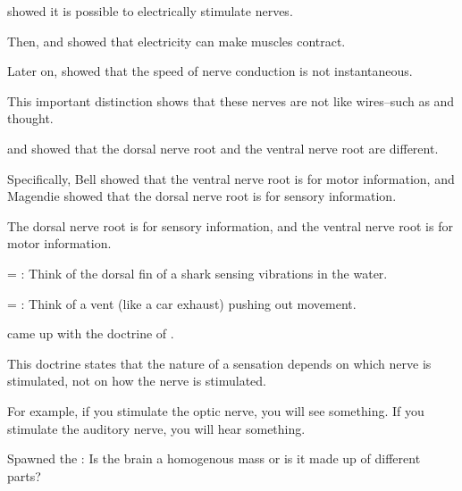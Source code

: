 \begin{coloredlist}
    \item \label{person:newton} showed it is possible to electrically stimulate nerves.
    \item Then, \label{{person:galvani}}  and \label{person:bois-reymond} showed that electricity can make muscles contract.
    \item Later on,  showed that the speed of nerve conduction is not instantaneous.
    \item This important distinction shows that these nerves are not like wires--such as  and  thought.
    \item {} and  showed that the dorsal nerve root and the ventral nerve root are different.
    \begin{coloredlist}
        \item Specifically, Bell showed that the ventral nerve root is for motor information, and Magendie showed that the dorsal nerve root is for sensory information.
    \end{coloredlist}
    \item The dorsal nerve root is for sensory information, and the ventral nerve root is for motor information.
    \item {} = : Think of the dorsal fin of a shark sensing vibrations in the water.
    \item {} = : Think of a vent (like a car exhaust) pushing out movement.
    \item \hypertarget{person:Muller}{} came up with the doctrine of .
    \begin{coloredlist}
        \item This doctrine states that the nature of a sensation depends on which nerve is stimulated, not on how the nerve is stimulated.
        \item For example, if you stimulate the optic nerve, you will see something. If you stimulate the auditory nerve, you will hear something.
    \end{coloredlist}
    \item Spawned the : Is the brain a homogenous mass or is it made up of different parts?
\end{coloredlist}

